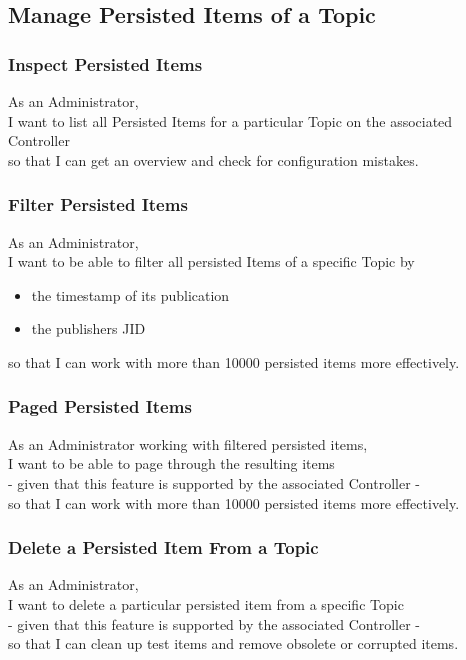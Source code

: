 \subsection{Manage Persisted Items of a Topic}
\subsubsection{Inspect Persisted Items}

As an Administrator,\\
I want to list all Persisted Items for a particular Topic on the associated Controller \\
so that I can get an overview and check for configuration mistakes.

\subsubsection{Filter Persisted Items}

As an Administrator,\\
I want to be able to filter all persisted Items of a specific Topic by \\
\begin{itemize}
    \item the timestamp of its publication
    \item the publishers JID
\end{itemize}
so that I can work with more than 10000 persisted items more effectively.

\subsubsection{Paged Persisted Items}
As an Administrator working with filtered persisted items,\\
I want to be able to page through the resulting items\\
- given that this feature is supported by the associated Controller -\\
so that I can work with more than 10000 persisted items more effectively.

\subsubsection{Delete a Persisted Item From a Topic}

As an Administrator,\\
I want to delete a particular persisted item from a specific Topic\\
- given that this feature is supported by the associated Controller -\\
so that I can clean up test items and remove obsolete or corrupted items.

